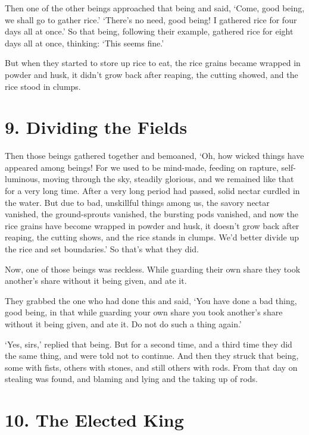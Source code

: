 \documentclass[12pt,openany]{book}%
\begin{document}
Then one of the other beings approached that being and said, ‘Come, good being, we shall go to gather rice.’ ‘There’s no need, good being! I gathered rice for four days all at once.’ So that being, following their example, gathered rice for eight days all at once, thinking: ‘This seems fine.’ 

But when they started to store up rice to eat, the rice grains became wrapped in powder and husk, it didn’t grow back after reaping, the cutting showed, and the rice stood in clumps. 

\section*{9. Dividing the Fields }

Then those beings gathered together and bemoaned, ‘Oh, how wicked things have appeared among beings! For we used to be mind-made, feeding on rapture, self-luminous, moving through the sky, steadily glorious, and we remained like that for a very long time. After a very long period had passed, solid nectar curdled in the water. But due to bad, unskillful things among us, the savory nectar vanished, the ground-sprouts vanished, the bursting pods vanished, and now the rice grains have become wrapped in powder and husk, it doesn’t grow back after reaping, the cutting shows, and the rice stands in clumps. We’d better divide up the rice and set boundaries.’ So that’s what they did. 

Now, one of those beings was reckless. While guarding their own share they took another’s share without it being given, and ate it. 

They grabbed the one who had done this and said, ‘You have done a bad thing, good being, in that while guarding your own share you took another’s share without it being given, and ate it. Do not do such a thing again.’ 

‘Yes, sirs,’ replied that being. But for a second time, and a third time they did the same thing, and were told not to continue. And then they struck that being, some with fists, others with stones, and still others with rods. From that day on stealing was found, and blaming and lying and the taking up of rods. 

\section*{10. The Elected King }
\end{document}

